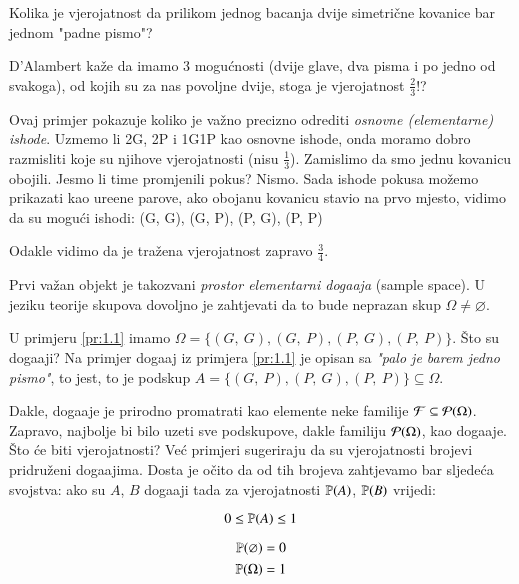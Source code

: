 \begin{pr}[D'Alambert 1754] \label{pr:1.1}
    Kolika je vjerojatnost da prilikom jednog bacanja dvije simetri\v cne kovanice bar jednom "padne pismo"?

    D'Alambert ka\v ze da imamo 3 mogu\' cnosti (dvije glave,
    dva pisma i po jedno od svakoga), od kojih su za nas povoljne
    dvije, stoga je vjerojatnost $\frac{2}{3}$!?
    
    Ovaj primjer pokazuje koliko je va\v zno precizno odrediti \emph{osnovne (elementarne) ishode}.
    Uzmemo li 2G, 2P i 1G1P kao osnovne ishode, onda moramo dobro razmisliti koje su njihove vjerojatnosti (nisu $\frac{1}{3}$). Zamislimo da smo jednu kovanicu obojili.
    Jesmo li time promjenili pokus?
    Nismo.
    Sada ishode pokusa mo\v zemo prikazati kao ure\dj ene parove, ako obojanu kovanicu stavio na prvo mjesto, vidimo da su mogu\' ci ishodi:
    (G, G), (G, P), (P, G), (P, P)
    
    Odakle vidimo da je tra\v zena vjerojatnost zapravo $\frac{3}{4}$.
\end{pr}

Prvi va\v zan objekt je takozvani \emph{prostor elementarni doga\dj aja} (sample space).
U jeziku teorije skupova dovoljno je zahtjevati da to bude neprazan skup $\Omega \neq \varnothing$.

U primjeru \ref{pr:1.1} imamo $ \Omega = \{(G, \: G), (G, \: P), (P, \: G), (P, \: P)\}$.
\v Sto su doga\dj aji?
Na primjer doga\dj aj iz primjera \ref{pr:1.1} je opisan sa \emph{"palo je barem jedno pismo"}, to jest, to je podskup $A = \{(G, \: P),(P, \: G), (P, \: P)\} \subseteq \Omega$.

Dakle, doga\dj aje je prirodno promatrati kao elemente neke familije $\mathcal{F} \subseteq \mathcal{P}({\Omega})$.
Zapravo, najbolje bi bilo uzeti sve podskupove, dakle familiju $\mathcal{P}({\Omega})$, kao doga\dj aje.
\v Sto \' ce biti vjerojatnosti?
Ve\' c primjeri sugeriraju da su vjerojatnosti brojevi pridru\v zeni doga\dj ajima.
Dosta je o\v cito da od tih brojeva zahtjevamo bar sljede\' ca svojstva: ako su $A$, $B$ doga\dj aji tada za vjerojatnosti $\mathbb{P}({A})$, $\mathbb{P}({B})$ vrijedi:

\begin{equation} \label{jed:1.2}
    0 \leq \mathbb{P}({A}) \leq 1
\end{equation}

\begin{align} \label{jed:1.3}
    \begin{split}
        \mathbb{P}({\varnothing}) &= 0 \\
        \mathbb{P}({\Omega}) &= 1
    \end{split}
\end{align}

